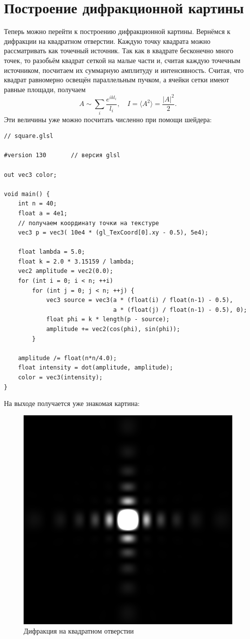 \section{Построение дифракционной картины}
Теперь можно перейти к построению дифракционной картины. Вернёмся к дифракции на квадратном отверстии. Каждую точку квадрата можно рассматривать как точечный источник. Так как в квадрате бесконечно много точек, то разобьём квадрат сеткой на малые части и, считая каждую точечным источником, посчитаем их суммарную амплитуду и интенсивность. Считая, что квадрат равномерно освещён параллельным пучком, а ячейки сетки имеют равные площади, получаем
\[
    A \sim \sum\limits_i \frac{e^{ikl_i}}{l_i},\quad I = \langle A^2 \rangle = \frac{|A|^2}{2}.
\]
Эти величины уже можно посчитать численно при помощи шейдера:
\begin{lstlisting}
// square.glsl

#version 130       // версия glsl

out vec3 color;

void main() {
    int n = 40;
    float a = 4e1;
    // получаем координату точки на текстуре
    vec3 p = vec3( 10e4 * (gl_TexCoord[0].xy - 0.5), 5e4);

    float lambda = 5.0;
    float k = 2.0 * 3.15159 / lambda;
    vec2 amplitude = vec2(0.0);
    for (int i = 0; i < n; ++i)
        for (int j = 0; j < n; ++j) {
            vec3 source = vec3(a * (float(i) / float(n-1) - 0.5),
                               a * (float(j) / float(n-1) - 0.5), 0);
            float phi = k * length(p - source);
            amplitude += vec2(cos(phi), sin(phi));
        }

    amplitude /= float(n*n/4.0);
    float intensity = dot(amplitude, amplitude);
    color = vec3(intensity);
}

\end{lstlisting}
На выходе получается уже знакомая картина:
\begin{figure}[h]
\center
\includegraphics[width=.3\textwidth]{2015-10-12-difraction-square.png}
\caption{Дифракция на квадратном отверстии}
\end{figure}

